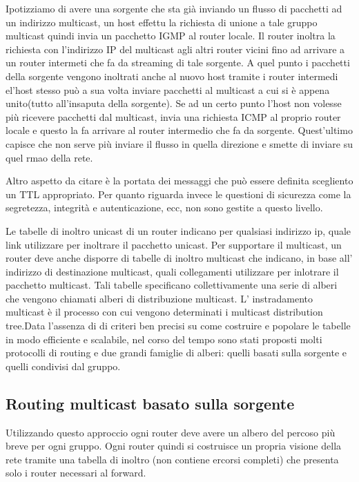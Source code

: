 \begin{example}
  Ipotizziamo di avere una sorgente che sta già inviando un flusso di pacchetti ad un indirizzo multicast, un host effettu la richiesta di unione a tale gruppo multicast quindi invia un pacchetto IGMP al router locale. Il router inoltra la richiesta con l'indirizzo IP del multicast agli altri router vicini fino ad arrivare a un router intermeti che fa da streaming di tale sorgente. A quel punto i pacchetti della sorgente vengono inoltrati anche al nuovo host tramite i router intermedi el'host stesso può a sua volta inviare pacchetti al multicast a cui si è appena unito(tutto all'insaputa della sorgente). Se ad un certo punto l'host non volesse più ricevere pacchetti dal multicast, invia una richiesta ICMP al proprio router locale e questo la fa arrivare al router intermedio che fa da sorgente. Quest'ultimo capisce che non serve più inviare il flusso in quella direzione e smette di inviare su quel rmao della rete.
\end{example}

Altro aspetto da citare è la portata dei messaggi che può essere definita scegliento un TTL appropriato. Per quanto riguarda invece le questioni di sicurezza come la segretezza, integrità e autenticazione, ecc, non sono gestite a questo livello.

Le tabelle di inoltro unicast di un router indicano per qualsiasi indirizzo ip, quale link utilizzare per inoltrare il pacchetto unicast. Per supportare il multicast, un router deve anche disporre di tabelle di inoltro multicast che indicano, in base all' indirizzo di destinazione multicast, quali collegamenti utilizzare per inlotrare il pacchetto multicast. Tali tabelle specificano collettivamente una serie di alberi che vengono chiamati alberi di distribuzione multicast. L' instradamento multicast  è il processo con cui vengono determinati i multicast distribution tree.Data l'assenza di di criteri ben precisi su come costruire e popolare le tabelle in modo efficiente e scalabile, nel corso del tempo sono stati proposti molti protocolli di routing e due grandi famiglie di alberi: quelli basati sulla sorgente e quelli condivisi dal gruppo.
\subsection{Routing multicast basato sulla sorgente}
Utilizzando questo approccio ogni router deve avere un albero del percoso più breve per ogni gruppo. Ogni router quindi si costruisce un propria visione della rete tramite una tabella di inoltro (non contiene ercorsi completi) che presenta solo i router necessari al forward. 

